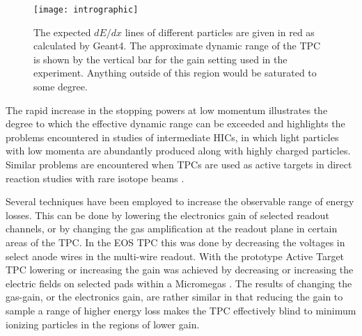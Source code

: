   
\begin{figure}[ht!]
\texttt{[image: intrographic]}
\caption{The expected $dE/dx$ lines of different particles are given in red as calculated by Geant4. The approximate dynamic range of the TPC is shown by the vertical bar for the gain setting used in the experiment. Anything outside of this region would be saturated to some degree.}
\label{fig:intro}
\end{figure}

The rapid increase in the stopping powers at low momentum illustrates the degree to which the effective dynamic range can be exceeded and highlights the problems encountered in studies of intermediate HICs, in which light particles with low momenta are abundantly produced along with highly charged particles. Similar problems are encountered when TPCs are used as active targets in direct reaction studies with rare isotope beams \cite{pattpc}. 

Several techniques have been employed to increase the observable range of energy losses. This can be done by lowering the electronics gain of selected readout channels, or by changing the gas amplification at the readout plane in certain areas of the TPC. In the EOS TPC \cite{eos} this was done by decreasing the voltages in select anode wires in the multi-wire readout. With the prototype Active Target TPC lowering or increasing the gain was achieved by decreasing or increasing the electric fields on selected pads within a Micromegas \cite{pattpc}. The results of changing the gas-gain, or the electronics gain, are rather similar in that reducing the gain to sample a range of higher energy loss makes the TPC effectively blind to minimum ionizing particles in  the regions of lower gain.




